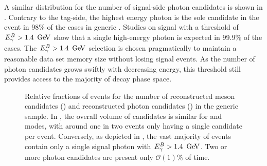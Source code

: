 A similar distribution for the number of signal-side photon candidates is shown in .
Contrary to the tag-side, the highest energy photon is the sole candidate in the event in 98\% of the cases in generic \MC.
Studies on \BtoXsgamma signal \MC with a threshold of ${E^B_{\gamma}}>1.4~\mathrm{\,Ge\kern -0.1em V}$ show that a single high-energy photon is expected in 99.9\% of the cases.
The ${E^B_{\gamma}}>1.4~\mathrm{\,Ge\kern -0.1em V}$ selection is chosen pragmatically to maintain a reasonable data set memory size without losing signal events.
As the number of photon candidates grows swiftly with decreasing energy, this threshold still provides access to the majority of \BtoXsgamma decay phase space.
\begin{figure}[htbp!]
    \centering
    \caption{\label{fig:reco_candidates} Relative fractions of events for the number of 
    reconstructed \B meson candidates () and
    reconstructed photon candidates () in the generic \MC sample.
    In , the overall volume of candidates is similar for \feiBp and \feiBz modes, 
    with around one in two events only having a single candidate per event.
    Conversely, as depicted in ,
    the vast majority of events contain only a single signal photon with ${E^B_{\gamma}}>1.4~\mathrm{\,Ge\kern -0.1em V}$.
    Two or more photon candidates are present only $\mathcal{O}(1)\%$ of time.
    }
\end{figure}

